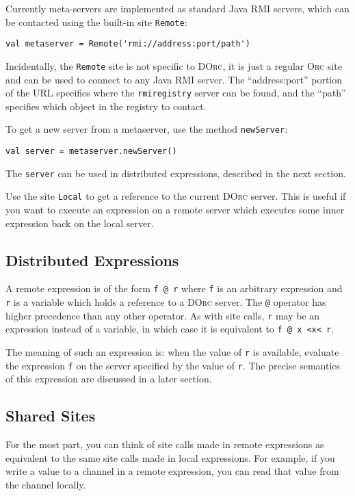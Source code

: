 \documentclass[10pt,letterpaper]{article}
\begin{document}
Currently meta-servers are implemented as standard Java RMI servers, which can
be contacted using the built-in site \texttt{Remote}:
\begin{verbatim}
val metaserver = Remote('rmi://address:port/path')
\end{verbatim}
Incidentally, the \texttt{Remote} site is not specific to \textsc{DOrc}, it is
just a regular \textsc{Orc} site and can be used to connect to any Java RMI
server. The ``address:port'' portion of the URL specifies where the
\texttt{rmiregistry} server can be found, and the ``path'' specifies which
object in the registry to contact.

To get a new server from a metaserver, use the method \texttt{newServer}:
\begin{verbatim}
val server = metaserver.newServer()
\end{verbatim}
The \texttt{server} can be used in distributed expressions, described in the
next section.

Use the site \texttt{Local} to get a reference to the current \textsc{DOrc}
server. This is useful if you want to execute an expression on a
remote server which executes some inner expression back on the local server.

\subsection{Distributed Expressions}

A remote expression is of the form \texttt{f @ r} where \texttt{f} is an
arbitrary expression and \texttt{r} is a variable which holds a reference to a
\textsc{DOrc} server. The \texttt{@} operator has higher precedence than any
other operator. As with site calls, \texttt{r} may be an expression instead of
a variable, in which case it is equivalent to \texttt{f @ x <x< r}.

The meaning of such an expression is: when the value of \texttt{r} is
available, evaluate the expression \texttt{f} on the server specified by the
value of \texttt{r}. The precise semantics of this expression are discussed in
a later section.

\subsection{Shared Sites}

For the most part, you can think of site calls made in remote expressions as
equivalent to the same site calls made in local expressions. For example, if
you write a value to a channel in a remote expression, you can read that value
from the channel locally.
\end{document}
